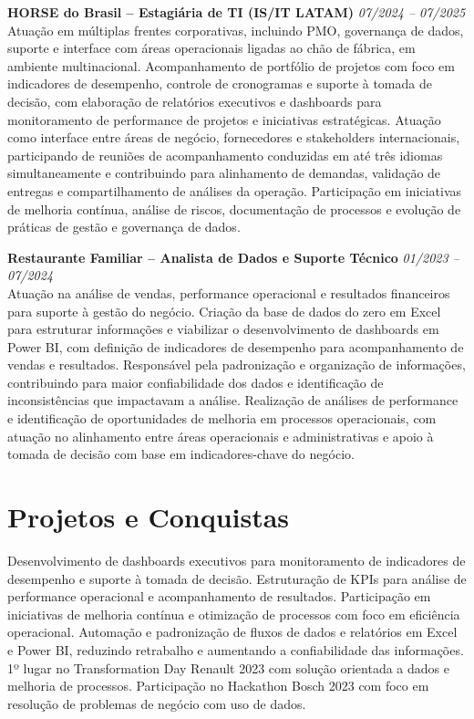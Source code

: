 \documentclass[11pt,a4paper]{article}
\newcommand{\experience}[3]{%
  \textbf{#1} \hfill \textit{#2}\\[4pt]
  #3
  \vspace{8pt}
}
\begin{document}
\experience{HORSE do Brasil -- Estagiária de TI (IS/IT LATAM)}{07/2024 -- 07/2025}{%
Atuação em múltiplas frentes corporativas, incluindo PMO, governança de dados, suporte e interface com áreas operacionais ligadas ao chão de fábrica, em ambiente multinacional. Acompanhamento de portfólio de projetos com foco em indicadores de desempenho, controle de cronogramas e suporte à tomada de decisão, com elaboração de relatórios executivos e dashboards para monitoramento de performance de projetos e iniciativas estratégicas. Atuação como interface entre áreas de negócio, fornecedores e stakeholders internacionais, participando de reuniões de acompanhamento conduzidas em até três idiomas simultaneamente e contribuindo para alinhamento de demandas, validação de entregas e compartilhamento de análises da operação. Participação em iniciativas de melhoria contínua, análise de riscos, documentação de processos e evolução de práticas de gestão e governança de dados.}

\experience{Restaurante Familiar -- Analista de Dados e Suporte Técnico}{01/2023 -- 07/2024}{%
Atuação na análise de vendas, performance operacional e resultados financeiros para suporte à gestão do negócio. Criação da base de dados do zero em Excel para estruturar informações e viabilizar o desenvolvimento de dashboards em Power BI, com definição de indicadores de desempenho para acompanhamento de vendas e resultados. Responsável pela padronização e organização de informações, contribuindo para maior confiabilidade dos dados e identificação de inconsistências que impactavam a análise. Realização de análises de performance e identificação de oportunidades de melhoria em processos operacionais, com atuação no alinhamento entre áreas operacionais e administrativas e apoio à tomada de decisão com base em indicadores-chave do negócio.}

\section*{Projetos e Conquistas}

Desenvolvimento de dashboards executivos para monitoramento de indicadores de desempenho e suporte à tomada de decisão. Estruturação de KPIs para análise de performance operacional e acompanhamento de resultados. Participação em iniciativas de melhoria contínua e otimização de processos com foco em eficiência operacional. Automação e padronização de fluxos de dados e relatórios em Excel e Power BI, reduzindo retrabalho e aumentando a confiabilidade das informações. 1º lugar no Transformation Day Renault 2023 com solução orientada a dados e melhoria de processos. Participação no Hackathon Bosch 2023 com foco em resolução de problemas de negócio com uso de dados.
\end{document}
